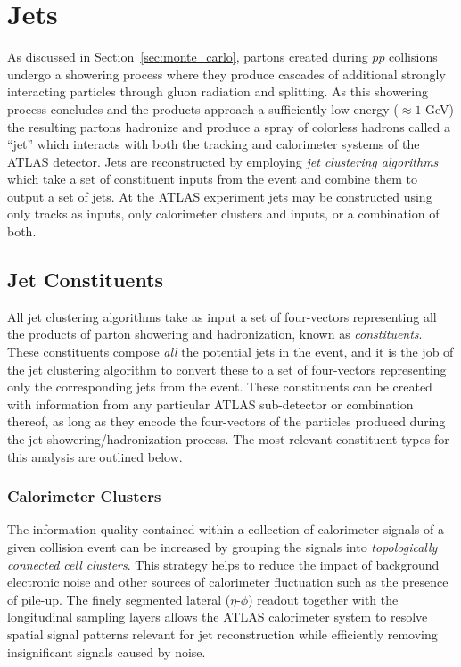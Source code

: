 \graphicspath{{Ch4_Jets/figures/}}

\chapter{Jets}
As discussed in Section~\ref{sec:monte_carlo}, partons created during $pp$ collisions undergo a showering process where they produce cascades of additional strongly interacting particles through gluon radiation and splitting.
As this showering process concludes and the products approach a sufficiently low energy ($\approx 1$ GeV) the resulting partons hadronize and produce a spray of colorless hadrons called a ``jet'' which interacts with both the tracking and calorimeter systems of the ATLAS detector.
Jets are reconstructed by employing \textit{jet clustering algorithms} which take a set of constituent inputs from the event and combine them to output a set of jets.
At the ATLAS experiment jets may be constructed using only tracks as inputs, only calorimeter clusters and inputs, or a combination of both.

\section{Jet Constituents}
All jet clustering algorithms take as input a set of four-vectors representing all the products of parton showering and hadronization, known as \textit{constituents}.
These constituents compose \textit{all} the potential jets in the event, and it is the job of the jet clustering algorithm to convert these to a set of four-vectors representing only the corresponding jets from the event.
These constituents can be created with information from any particular ATLAS sub-detector or combination thereof, as long as they encode the four-vectors of the particles produced during the jet showering/hadronization process.
The most relevant constituent types for this analysis are outlined below.

\subsection{Calorimeter Clusters}
The information quality contained within a collection of calorimeter signals of a given collision event can be increased by grouping the signals into \textit{topologically connected cell clusters}.
This strategy helps to reduce the impact of background electronic noise and other sources of calorimeter fluctuation such as the presence of pile-up.
The finely segmented lateral ($\eta$-$\phi$) readout together with the longitudinal sampling layers allows the ATLAS calorimeter system to resolve spatial signal patterns relevant for jet reconstruction while efficiently removing insignificant signals caused by noise.

